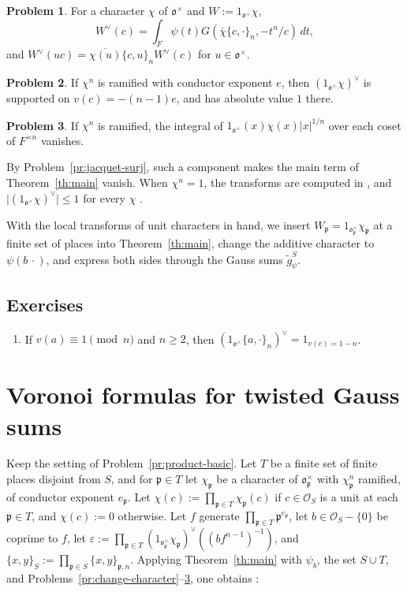 \documentclass[reqno]{amsart}
\newcommand{\oo}{\mathfrak{o}}
\newcommand{\pp}{\mathfrak{p}}
\numberwithin{equation}{section}
\theoremstyle{definition}
\newtheorem{problem}{Problem}[section]
\theoremstyle{plain}
\newenvironment{exercises}{\subsection*{Exercises}\begin{enumerate}[1.]}{\end{enumerate}}
\begin{document}
\begin{problem}\label{pr:twisted-reduction}
  For a character $\chi$ of $\oo^\times$ and $W := 1_{\oo^\times} \chi$,
  \begin{equation*}
    W^\vee(c) = \int_F \psi(t) G(\overline{\chi} \{c, \cdot\}_n, - t^n / c) \, d t,
  \end{equation*}
  and $W^\vee(u c) = \overline{\chi(u)} \{c, u\}_n W^\vee(c)$ for $u \in \oo^\times$.
\end{problem}

\begin{problem}\label{pr:twisted-support}
  If $\chi^n$ is ramified with conductor exponent $e$, then $(1_{\oo^\times} \chi)^\vee$ is supported on $v(c) = -(n-1) e$, and has absolute value $1$ there.
\end{problem}

\begin{problem}\label{pr:twisted-vanishing}
  If $\chi^n$ is ramified, the integral of $1_{\oo^\times}(x) \chi(x) \lvert x \rvert^{1/n}$ over each coset of $F^{\times n}$ vanishes.
\end{problem}

By Problem~\ref{pr:jacquet-surj}, such a component makes the main term of Theorem~\ref{th:main} vanish.  When $\chi^n = 1$, the transforms are computed in \cite[Proposition~10.27]{N}, and $\lvert (1_{\oo^\times} \chi)^\vee \rvert \leq 1$ for every $\chi$ \cite[Corollary~10.29]{N}.

With the local transforms of unit characters in hand, we insert $W_\pp = 1_{\oo_\pp^\times} \chi_\pp$ at a finite set of places into Theorem~\ref{th:main}, change the additive character to $\psi(b \, \cdot)$, and express both sides through the Gauss sums $\tilde{g}_\psi^S$.

\begin{exercises}
\item If $v(a) \equiv 1 \pmod n$ and $n \geq 2$, then $(1_{\oo^\times} \{a, \cdot\}_n)^\vee = 1_{v(c) = 1 - n}$.
\end{exercises}

\section{Voronoi formulas for twisted Gauss sums}\label{sec:voronoi}

Keep the setting of Problem~\ref{pr:product-basic}.  Let $T$ be a finite set of finite places disjoint from $S$, and for $\pp \in T$ let $\chi_\pp$ be a character of $\oo_\pp^\times$ with $\chi_\pp^n$ ramified, of conductor exponent $e_\pp$.  Let $\chi(c) := \prod_{\pp \in T} \chi_\pp(c)$ if $c \in \mathcal{O}_S$ is a unit at each $\pp \in T$, and $\chi(c) := 0$ otherwise.  Let $f$ generate $\prod_{\pp \in T} \pp^{e_\pp}$, let $b \in \mathcal{O}_S - \{0\}$ be coprime to $f$, let $\varepsilon := \prod_{\pp \in T} (1_{\oo_\pp^\times} \chi_\pp)^\vee((b f^{n-1})^{-1})$, and $\{x, y\}_S := \prod_{\pp \in S} \{x, y\}_{\pp, n}$.  Applying Theorem~\ref{th:main} with $\psi_b$, the set $S \cup T$, and Problems~\ref{pr:change-character}--\ref{pr:twisted-vanishing}, one obtains \cite[Theorem~10.33]{N}:
\end{document}
